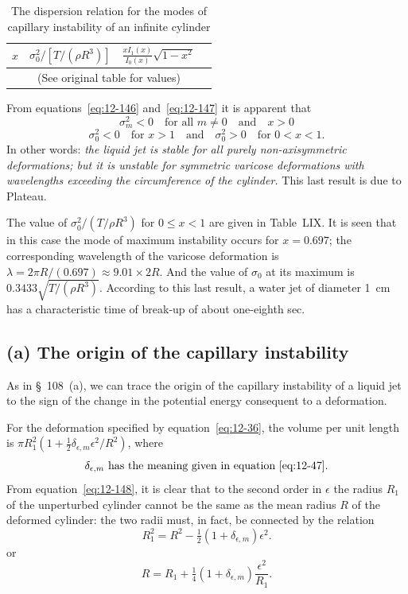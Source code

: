 \begin{table}[ht]
\centering
\caption{The dispersion relation for the modes of capillary instability of an infinite cylinder}
\label{tab:LIX}
\begin{tabular}{cccc}
\hline
$x$ & $\sigma_0^2/[T/(\rho R^3)]$ & $\frac{xI_1(x)}{I_0(x)}\sqrt{1-x^2}$ & \\
\hline
\multicolumn{4}{c}{(See original table for values)} \\
\hline
\end{tabular}
\end{table}

From equations~\eqref{eq:12-146} and~\eqref{eq:12-147} it is apparent that
\[
\sigma_m^2 < 0 \quad \text{for all } m \neq 0 \quad \text{and} \quad x > 0
\]
\[
\sigma_0^2 < 0 \quad \text{for } x > 1 \quad \text{and} \quad \sigma_0^2 > 0 \quad \text{for } 0 < x < 1.
\]
In other words: \emph{the liquid jet is stable for all purely non-axisymmetric deformations; but it is unstable for symmetric varicose deformations with wavelengths exceeding the circumference of the cylinder.} This last result is due to Plateau.

The value of $\sigma_0^2/(T/\rho R^3)$ for $0 \leq x < 1$ are given in Table~LIX. It is seen that in this case the mode of maximum instability occurs for $x = 0.697$; the corresponding wavelength of the varicose deformation is $\lambda = 2\pi R/(0.697) \approx 9.01 \times 2R$. And the value of $\sigma_0$ at its maximum is $0.3433\sqrt{T/(\rho R^3)}$. According to this last result, a water jet of diameter 1~cm has a characteristic time of break-up of about one-eighth sec.

\subsection*{(a) The origin of the capillary instability}

As in \S~108~(a), we can trace the origin of the capillary instability of a liquid jet to the sign of the change in the potential energy consequent to a deformation.

For the deformation specified by equation~\eqref{eq:12-36}, the volume per unit length is $\pi R_1^2(1+\frac{1}{2}\delta_{\epsilon,m}\epsilon^2/R^2)$, where
\begin{equation}
\label{eq:12-148}
\delta_{\epsilon,m} \text{ has the meaning given in equation~\eqref{eq:12-47}}.
\end{equation}
From equation~\eqref{eq:12-148}, it is clear that to the second order in $\epsilon$ the radius $R_1$ of the unperturbed cylinder cannot be the same as the mean radius $R$ of the deformed cylinder: the two radii must, in fact, be connected by the relation
\begin{equation}
\label{eq:12-149}
R_1^2 = R^2 - \tfrac{1}{2}(1+\delta_{\epsilon,m})\epsilon^2.
\end{equation}
or
\begin{equation}
\label{eq:12-150}
R = R_1 + \tfrac{1}{4}(1+\delta_{\epsilon,m})\frac{\epsilon^2}{R_1}.
\end{equation}

